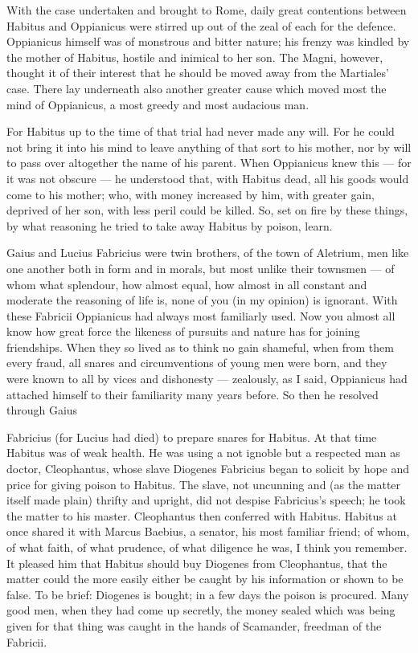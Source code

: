  With the case undertaken and brought to Rome, daily great contentions between Habitus and Oppianicus were stirred up out of the zeal of each for the defence. Oppianicus himself was of monstrous and bitter nature; his frenzy was kindled by the mother of Habitus, hostile and inimical to her son. The Magni, however, thought it of their interest that he should be moved away from the Martiales' case. There lay underneath also another greater cause which moved most the mind of Oppianicus, a most greedy and most audacious man.

 For Habitus up to the time of that trial had never made any will. For he could not bring it into his mind to leave anything of that sort to his mother, nor by will to pass over altogether the name of his parent. When Oppianicus knew this --- for it was not obscure --- he understood that, with Habitus dead, all his goods would come to his mother; who, with money increased by him, with greater gain, deprived of her son, with less peril could be killed. So, set on fire by these things, by what reasoning he tried to take away Habitus by poison, learn.

 Gaius and Lucius Fabricius were twin brothers, of the town of Aletrium, men like one another both in form and in morals, but most unlike their townsmen --- of whom what splendour, how almost equal, how almost in all constant and moderate the reasoning of life is, none of you (in my opinion) is ignorant. With these Fabricii Oppianicus had always most familiarly used. Now you almost all know how great force the likeness of pursuits and nature has for joining friendships. When they so lived as to think no gain shameful, when from them every fraud, all snares and circumventions of young men were born, and they were known to all by vices and dishonesty --- zealously, as I said, Oppianicus had attached himself to their familiarity many years before. So then he resolved through Gaius

 Fabricius (for Lucius had died) to prepare snares for Habitus. At that time Habitus was of weak health. He was using a not ignoble but a respected man as doctor, Cleophantus, whose slave Diogenes Fabricius began to solicit by hope and price for giving poison to Habitus. The slave, not uncunning and (as the matter itself made plain) thrifty and upright, did not despise Fabricius's speech; he took the matter to his master. Cleophantus then conferred with Habitus. Habitus at once shared it with Marcus Baebius, a senator, his most familiar friend; of whom, of what faith, of what prudence, of what diligence he was, I think you remember. It pleased him that Habitus should buy Diogenes from Cleophantus, that the matter could the more easily either be caught by his information or shown to be false. To be brief: Diogenes is bought; in a few days the poison is procured. Many good men, when they had come up secretly, the money sealed which was being given for that thing was caught in the hands of Scamander, freedman of the Fabricii.


